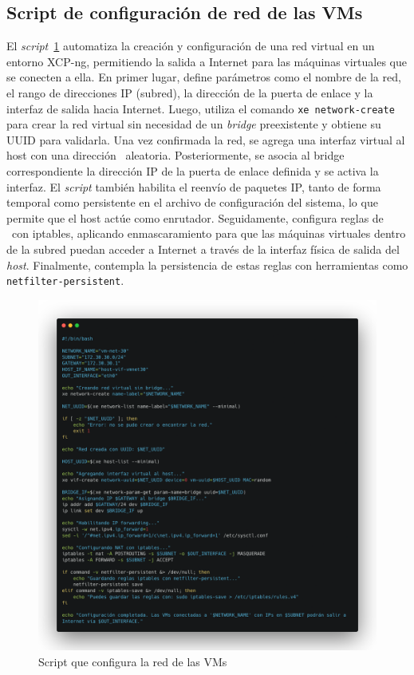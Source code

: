 \subsection{Script de configuración de red de las VMs}
\noindent
El \textit{script}~\ref{fig:configure-network} automatiza la creación y configuración de una red virtual en un entorno XCP-ng, permitiendo la salida a Internet para las máquinas virtuales que se conecten a ella. En primer lugar, define parámetros como el nombre de la red, el rango de direcciones IP (subred), la dirección de la puerta de enlace y la interfaz de salida hacia Internet. Luego, utiliza el comando \texttt{xe network-create} para crear la red virtual sin necesidad de un \textit{bridge} preexistente y obtiene su UUID para validarla. Una vez confirmada la red, se agrega una interfaz virtual al host con una dirección \MAC\ aleatoria. Posteriormente, se asocia al bridge correspondiente la dirección IP de la puerta de enlace definida y se activa la interfaz.
\noindent
El \textit{script} también habilita el reenvío de paquetes IP, tanto de forma temporal como persistente en el archivo de configuración del sistema, lo que permite que el host actúe como enrutador. Seguidamente, configura reglas de \NAT\ con iptables, aplicando enmascaramiento para que las máquinas virtuales dentro de la subred puedan acceder a Internet a través de la interfaz física de salida del \textit{host}. Finalmente, contempla la persistencia de estas reglas con herramientas como \texttt{netfilter-persistent}.
\begin{figure}[H]
    \centering
    \includegraphics[width=\textwidth]{tablas-images/cp6/src/red.png}
    \caption{Script que configura la red de las VMs}\label{fig:configure-network}
\end{figure}

